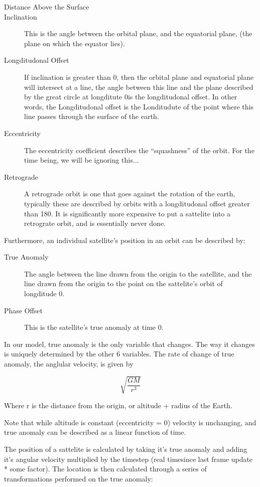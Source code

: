\documentclass[12pt]{article}
\begin{document}
\begin{description}
\item[Distance Above the Surface]
\item[Inclination]
This is the angle between the orbital plane, and the equatorial plane, (the plane on which the equator lies).
\item[Longditudonal Offset]
If inclination is greater than 0\degree, then the orbital plane and equatorial plane will intersect at a line, the angle between this line and the plane described by the great circle at longditute 0\degree is the longditudonal offset. In other words, the Longditudonal offset is the Londitudute of the point where this line passes through the surface of the earth.
\item[Eccentricity]
The eccentricity coefficient describes the “squashness” of the orbit. For the time being, we will be ignoring this...
\item[Retrograde]
A retrograde orbit is one that goes against the rotation of the earth, typically these are described by orbits with a longditudonal offset greater than 180\degree. It is significantly more expensive to put a sattelite into a retrograte orbit, and is essentially never done.
\end{description}

Furthermore, an individual satellite's position in an orbit can be described by:

\begin{description}
\item[True Anomaly]
The angle between the line drawn from the origin to the satellite, and the line drawn from the origin to the point on the sattelite's orbit of longditude 0.
\item[Phase Offset]
This is the satellite's true anomaly at time 0.
\end{description}

In our model, true anomaly is the only variable that changes. The way it changes is uniquely determined by the other 6 variables. The rate of change of true anomaly, the anglular velocity, is given by

\[\sqrt{\frac{GM}{r^3}}\]

Where r is the distance from the origin, or altitude + radius of the Earth.

Note that while altitude is constant (eccentricity = 0) velocity is unchanging, and true anomaly can be described as a linear function of time.

The position of a sattelite is calculated by taking it’s true anomaly and adding it’s angular velocity multiplied by the timestep (real timesince last frame update * some factor). The location is then calculated through a series of transformations performed on the true anomaly:
\end{document}
